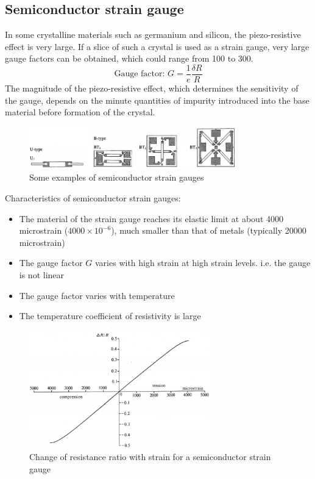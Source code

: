 \documentclass[class=report, crop=false, 12pt,a4paper, tikz, border=4mm]{standalone}
\begin{document}
\subsection{Semiconductor strain gauge}
In some crystalline materials such as germanium and silicon, the piezo-resistive effect is very large. If a slice of such a crystal is used as a strain gauge, very large gauge factors can be obtained, which could range from 100 to 300. 
\begin{equation}
  \textrm{Gauge factor: }G = \frac{1}{e}\frac{\delta R}{R}
\end{equation}
The magnitude of the piezo-resistive effect, which determines the sensitivity of the gauge, depends on the minute quantities of impurity introduced into the base material before formation of the crystal.
\begin{figure}[H]
  \centering
  \includegraphics[width = 0.8\textwidth]{../img/diagram19.png}
  \caption{Some examples of semiconductor strain gauges}
\end{figure}
Characteristics of semiconductor strain gauges:
\begin{itemize}
  \item The material of the strain gauge reaches its elastic limit at about 4000 microstrain ($4000\times 10^{-6}$), much smaller than that of metals (typically 20000 microstrain)
  \item The gauge factor $G$ varies with high strain at high strain levels. i.e. the gauge is not linear
  \item The gauge factor varies with temperature
  \item The temperature coefficient of resistivity is large
\end{itemize}
\begin{figure}[H]
  \centering
  \includegraphics[width = 0.7\textwidth]{../img/diagram20.png}
  \caption{Change of resistance ratio with strain for a semiconductor strain gauge}
\end{figure}
\end{document}
